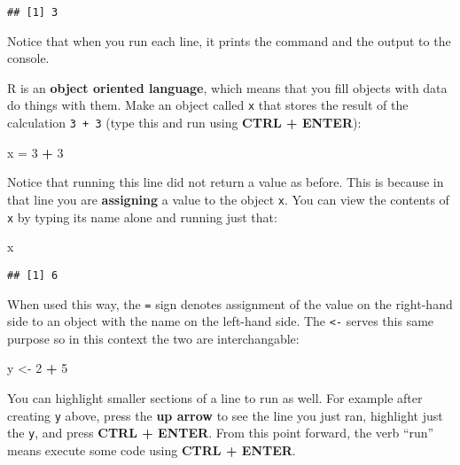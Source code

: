 \documentclass[]{book}
\newenvironment{Shaded}{\begin{snugshade}}{\end{snugshade}}
\newcommand{\DecValTok}[1]{\textcolor[rgb]{0.00,0.00,0.81}{#1}}
\newcommand{\StringTok}[1]{\textcolor[rgb]{0.31,0.60,0.02}{#1}}
\newcommand{\OperatorTok}[1]{\textcolor[rgb]{0.81,0.36,0.00}{\textbf{#1}}}
\newcommand{\NormalTok}[1]{#1}
\theoremstyle{definition}
\theoremstyle{definition}
\theoremstyle{definition}
\theoremstyle{remark}
\begin{document}
\begin{verbatim}
## [1] 3
\end{verbatim}

Notice that when you run each line, it prints the command and the output
to the console.

R is an \textbf{object oriented language}, which means that you fill
objects with data do things with them. Make an object called \texttt{x}
that stores the result of the calculation \texttt{3\ +\ 3} (type this
and run using \textbf{CTRL + ENTER}):

\begin{Shaded}
\begin{Highlighting}[]
\NormalTok{x =}\StringTok{ }\DecValTok{3} \OperatorTok{+}\StringTok{ }\DecValTok{3}
\end{Highlighting}
\end{Shaded}

Notice that running this line did not return a value as before. This is
because in that line you are \textbf{assigning} a value to the object
\texttt{x}. You can view the contents of \texttt{x} by typing its name
alone and running just that:

\begin{Shaded}
\begin{Highlighting}[]
\NormalTok{x}
\end{Highlighting}
\end{Shaded}

\begin{verbatim}
## [1] 6
\end{verbatim}

When used this way, the \texttt{=} sign denotes assignment of the value
on the right-hand side to an object with the name on the left-hand side.
The \texttt{\textless{}-} serves this same purpose so in this context
the two are interchangable:

\begin{Shaded}
\begin{Highlighting}[]
\NormalTok{y <-}\StringTok{ }\DecValTok{2} \OperatorTok{+}\StringTok{ }\DecValTok{5}
\end{Highlighting}
\end{Shaded}

You can highlight smaller sections of a line to run as well. For example
after creating \texttt{y} above, press the \textbf{up arrow} to see the
line you just ran, highlight just the \texttt{y}, and press \textbf{CTRL
+ ENTER}. From this point forward, the verb ``run'' means execute some
code using \textbf{CTRL + ENTER}.
\end{document}
